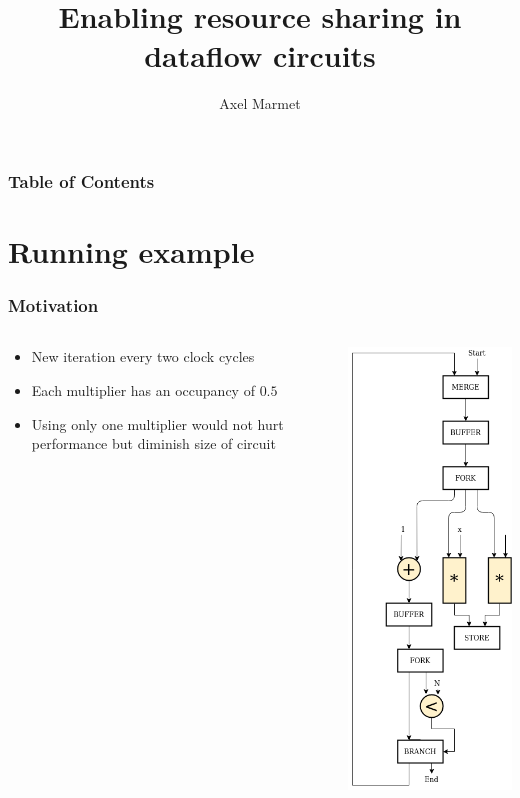 \documentclass{beamer}
\title[Resource Sharing] %
{Enabling resource sharing in dataflow circuits}
\author[Marmet] %
{Axel Marmet}
\institute[EPFL] %
\date[EPFL 2019] %
\begin{document}
\frame{\titlepage}


\begin{frame}
\frametitle{Table of Contents}
\tableofcontents
\end{frame}

\section{Running example}
\begin{frame}[fragile]
\frametitle{Motivation}
\begin{columns}[T]
    \begin{column}{0.45\textwidth}
      \begin{itemize}
          \item New iteration every two clock cycles
          \item Each multiplier has an occupancy of $0.5$
          \item Using only one multiplier would not hurt performance but diminish size of circuit
      \end{itemize}
    \end{column}
    \begin{column}{0.1\textwidth}
    \end{column}
    \begin{column}{0.45\textwidth}
      \includegraphics[scale=0.28]{base_case.png}

\end{column}
\end{columns}
\end{frame}
\end{document}
